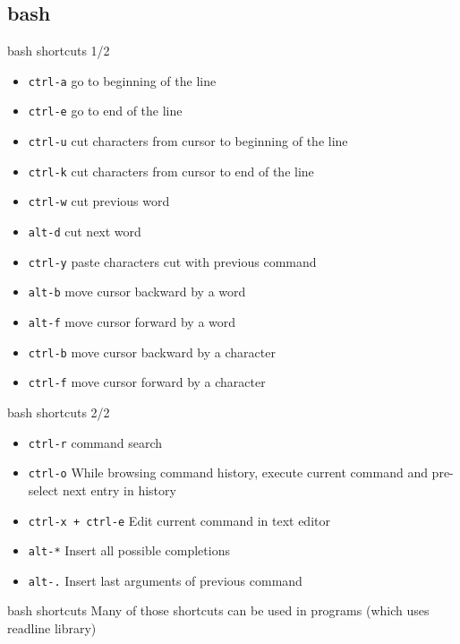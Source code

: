 \subsection{bash}

\begin{frame}[fragile]{bash shortcuts 1/2}
  \begin{itemize}
    \pause \item \texttt{ctrl-a} go to beginning of the line
    \pause \item \texttt{ctrl-e} go to end of the line
    \pause \item \texttt{ctrl-u} cut characters from cursor to beginning of the line
    \pause \item \texttt{ctrl-k} cut characters from cursor to end of the line
    \pause \item \texttt{ctrl-w} cut previous word
    \pause \item \texttt{alt-d} cut next word
    \pause \item \texttt{ctrl-y} paste characters cut with previous command
    \pause \item \texttt{alt-b} move cursor backward by a word
    \pause \item \texttt{alt-f} move cursor forward by a word
    \pause \item \texttt{ctrl-b} move cursor backward by a character
    \pause \item \texttt{ctrl-f} move cursor forward by a character
  \end{itemize}
\end{frame}

\begin{frame}[fragile]{bash shortcuts 2/2}
  \begin{itemize}
    \item \texttt{ctrl-r} command search
    \pause \item \texttt{ctrl-o} While browsing command history, execute current command and pre-select next entry in history
    \pause \item \texttt{ctrl-x + ctrl-e} Edit current command in text editor
    \pause \item \texttt{alt-*} Insert all possible completions
    \pause \item \texttt{alt-.} Insert last arguments of previous command
  \end{itemize}
\end{frame}

\begin{frame}[fragile]{bash shortcuts}
Many of those shortcuts can be used in programs (which uses readline library)
\end{frame}

